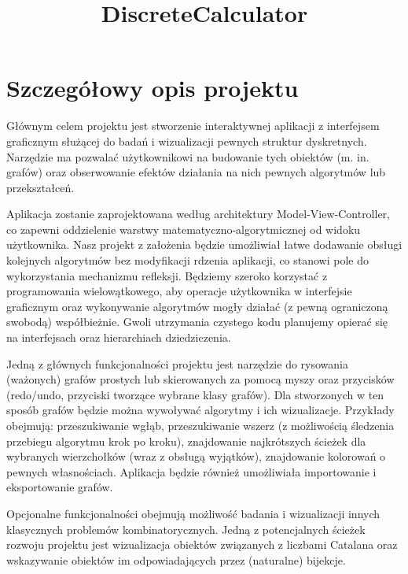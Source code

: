\documentclass{article}
\title{DiscreteCalculator}
\author{}
\date{}
\begin{document}
\maketitle

\section{Szczegółowy opis projektu}
    \par{Głównym celem projektu jest stworzenie interaktywnej aplikacji z interfejsem graficznym służącej do badań i wizualizacji pewnych struktur dyskretnych. Narzędzie ma pozwalać użytkownikowi na budowanie tych obiektów (m. in. grafów) oraz obserwowanie efektów działania na nich pewnych algorytmów lub przekształceń.}  
    \\
    \par{Aplikacja zostanie zaprojektowana według architektury Model-View-Controller, co zapewni oddzielenie warstwy matematyczno-algorytmicznej od widoku użytkownika. 
    Nasz projekt z założenia będzie umożliwiał łatwe dodawanie obsługi kolejnych algorytmów bez modyfikacji rdzenia aplikacji, co stanowi pole do wykorzystania mechanizmu refleksji. 
    Będziemy szeroko korzystać z programowania wielowątkowego, aby operacje użytkownika w interfejsie graficznym oraz wykonywanie algorytmów mogły działać (z pewną ograniczoną swobodą) współbieżnie. 
    Gwoli utrzymania czystego kodu planujemy opierać się na interfejsach oraz hierarchiach dziedziczenia.}
    \\
    \par{Jedną z głównych funkcjonalności projektu jest narzędzie do rysowania (ważonych) grafów prostych lub skierowanych za pomocą myszy oraz przycisków (redo/undo, przyciski tworzące wybrane klasy grafów). Dla stworzonych w ten sposób grafów będzie można wywoływać algorytmy i ich wizualizacje. Przykłady obejmują: przeszukiwanie wgłąb, przeszukiwanie wszerz (z możliwością śledzenia przebiegu algorytmu krok po kroku), znajdowanie najkrótszych ścieżek dla wybranych wierzchołków (wraz z obsługą wyjątków), znajdowanie kolorowań o pewnych własnościach. Aplikacja będzie również umożliwiała importowanie i eksportowanie grafów.}
    \\
    \par{Opcjonalne funkcjonalności obejmują możliwość badania i wizualizacji innych klasycznych problemów kombinatorycznych. Jedną z potencjalnych ścieżek rozwoju projektu jest wizualizacja obiektów związanych z liczbami Catalana oraz wskazywanie obiektów im odpowiadających przez (naturalne) bijekcje. }
\end{document}
